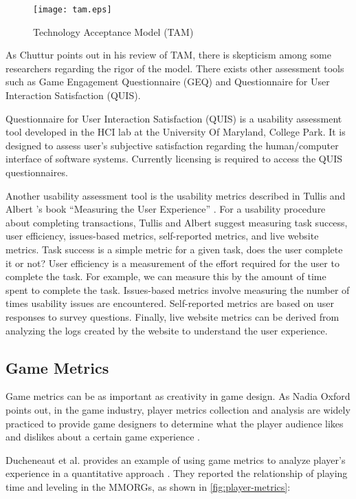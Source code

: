 \begin{figure}[ht!]
	\centering
		\texttt{[image: tam.eps]}
		\caption{Technology Acceptance Model (TAM) \cite{davis1986technology}}
		\label{fig:tam}
\end{figure}

As Chuttur \cite{chuttur2009overview} points out in his review of TAM, there is  skepticism among some researchers regarding the rigor of the model. There exists  other assessment tools such as Game Engagement Questionnaire (GEQ) and Questionnaire for User Interaction Satisfaction (QUIS).  

Questionnaire for User Interaction Satisfaction (QUIS) \cite{harper1993improving} is a usability assessment tool developed in the HCI lab at the University Of Maryland, College Park. It is designed to assess user's subjective satisfaction regarding the human/computer interface of software systems. Currently licensing is required to access the QUIS questionnaires. 

Another usability assessment tool is the usability metrics described in Tullis and Albert 's book ``Measuring the User Experience'' \cite{tullis2010measuring}. For a usability procedure about completing transactions, Tullis and Albert suggest measuring task success, user efficiency, issues-based metrics, self-reported metrics, and live website metrics. Task success is a simple metric for a given task, does the user complete it or not? User efficiency is a measurement
of the effort required for the user to complete the task. For example, we can measure this by the amount of time spent to complete the task. Issues-based metrics involve measuring the number of times usability issues are encountered. Self-reported metrics are based on user responses to survey questions. Finally, live website metrics can be derived from analyzing the logs created by the website to understand the user experience.

\subsection{Game Metrics}

Game metrics can be as important as creativity in game design. As Nadia Oxford points out, in the game industry, player metrics collection and analysis are widely practiced to provide game designers to determine what the player audience likes and dislikes about a certain game experience \cite {Oxford2010}. 

Ducheneaut et al. provides an example of 
using game metrics to analyze player's experience in a quantitative approach \cite {ducheneaut2006alone}. They reported the relationship of playing time and leveling in the MMORGs, as shown in \autoref{fig:player-metrics}:

